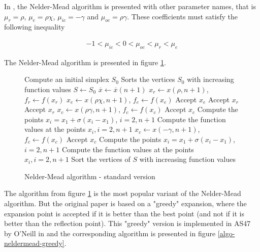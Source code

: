 In \cite{Kelley1999}, the Nelder-Mead algorithm is presented with 
other parameter names, that is $\mu_r = \rho$, $\mu_e = \rho\chi$, $\mu_{ic} = -\gamma$
and $\mu_{oc} = \rho\gamma$. These coefficients must satisfy the following 
inequality 

\begin{eqnarray}
-1 < \mu_{ic} < 0 < \mu_{oc} < \mu_r < \mu_e
\end{eqnarray}

The Nelder-Mead algorithm is presented in figure \ref{algo-neldermead}.

\begin{figure}[htbp]
\begin{algorithmic}
\STATE Compute an initial simplex $S_0$
\STATE Sorts the vertices $S_0$ with increasing function values
\STATE $S\gets S_0$
  \STATE $\overline{x}\gets \overline{x}(n+1)$
  \STATE $x_r \gets x(\rho,n+1)$, $f_r \gets f(x_r)$ 
    \STATE $x_e \gets x(\rho\chi,n+1)$, $f_e \gets f(x_e)$ 
      \STATE Accept $x_e$
    \ELSE
      \STATE Accept $x_r$
    \ENDIF
    \STATE Accept $x_r$
    \STATE $x_c \gets x(\rho\gamma,n+1)$, $f_c \gets f(x_c)$ 
      \STATE Accept $x_c$
    \ELSE
      \STATE Compute the points $x_i=x_1 + \sigma (x_i - x_1)$, $i=2,n+1$ 
      \STATE Compute the function values at the points $x_i, i=2,n+1$
    \ENDIF
  \ELSE
    \STATE $x_c \gets x(-\gamma,n+1)$, $f_c \gets f(x_c)$ 
      \STATE Accept $x_c$
    \ELSE
      \STATE Compute the points $x_i=x_1 + \sigma (x_i - x_1)$, $i=2,n+1$ 
      \STATE Compute the function values at the points $x_i, i=2,n+1$
    \ENDIF
  \ENDIF
  \STATE Sort the vertices of $S$ with increasing function values
\ENDWHILE
\end{algorithmic}
\caption{Nelder-Mead algorithm - standard version}
\label{algo-neldermead}
\end{figure}

The algorithm from figure \ref{algo-neldermead} is the most 
popular variant of the Nelder-Mead algorithm.
But the original paper is based on a "greedy" expansion, where 
the expansion point is accepted if it is better than the 
best point (and not if it is better than the reflection point).
This "greedy" version is implemented in AS47 by O'Neill in \cite{O'Neill1971AAF}
and the corresponding algorithm is presented in figure \ref{algo-neldermead-greedy}.

